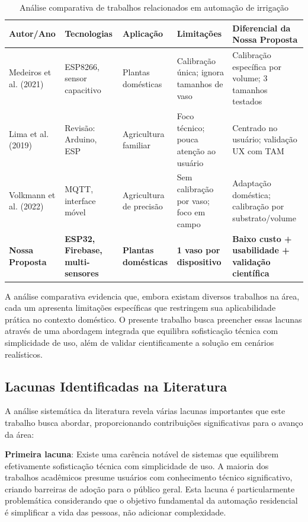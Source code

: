 \documentclass[twoside,english,brazilian]{UNISINOSmonografia}
\begin{document}
\begin{table}[htbp]
\centering
\caption{Análise comparativa de trabalhos relacionados em automação de irrigação}
\label{tab:comparativo}
\scriptsize
\begin{tabular}{p{2.2cm}p{2.0cm}p{2.6cm}p{2.8cm}p{3.0cm}}
\toprule
\textbf{Autor/Ano} & \textbf{Tecnologias} & \textbf{Aplicação} & \textbf{Limitações} & \textbf{Diferencial da Nossa Proposta} \\
\midrule
Medeiros et al. (2021) & ESP8266, sensor capacitivo & Plantas domésticas & Calibração única; ignora tamanhos de vaso & Calibração específica por volume; 3 tamanhos testados \\
\midrule
Lima et al. (2019) & Revisão: Arduino, ESP & Agricultura familiar & Foco técnico; pouca atenção ao usuário & Centrado no usuário; validação UX com TAM \\
\midrule
Volkmann et al. (2022) & MQTT, interface móvel & Agricultura de precisão & Sem calibração por vaso; foco em campo & Adaptação doméstica; calibração por substrato/volume \\
\midrule
\textbf{Nossa Proposta} & \textbf{ESP32, Firebase, multi-sensores} & \textbf{Plantas domésticas} & \textbf{1 vaso por dispositivo} & \textbf{Baixo custo + usabilidade + validação científica} \\
\bottomrule
\end{tabular}
\end{table}

A análise comparativa evidencia que, embora existam diversos trabalhos na área, cada um apresenta limitações específicas que restringem sua aplicabilidade prática no contexto doméstico. O presente trabalho busca preencher essas lacunas através de uma abordagem integrada que equilibra sofisticação técnica com simplicidade de uso, além de validar cientificamente a solução em cenários realísticos.

\subsection{Lacunas Identificadas na Literatura}

A análise sistemática da literatura revela várias lacunas importantes que este trabalho busca abordar, proporcionando contribuições significativas para o avanço da área:

\textbf{Primeira lacuna}: Existe uma carência notável de sistemas que equilibrem efetivamente sofisticação técnica com simplicidade de uso. A maioria dos trabalhos acadêmicos presume usuários com conhecimento técnico significativo, criando barreiras de adoção para o público geral. Esta lacuna é particularmente problemática considerando que o objetivo fundamental da automação residencial é simplificar a vida das pessoas, não adicionar complexidade.
\end{document}
